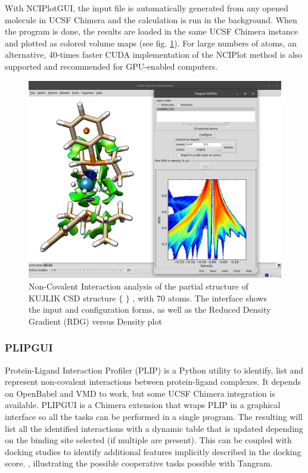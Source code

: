 With NCIPlotGUI, the input file is automatically generated from any opened molecule in UCSF Chimera and the calculation is run in the background. When the program is done, the results are loaded in the same UCSF Chimera instance and plotted as colored volume maps (see fig. \ref{fig:tangram-nciplot}). For large numbers of atoms, an alternative, 40-times faster CUDA implementation of the NCIPlot method\cite{nciplotcuda} is also supported and recommended for GPU-enabled computers.



\begin{figure}
	\begin{Center}
		\includegraphics[width=\textwidth]{./figures/05/tangram_nciplot.png}
		\caption[Tangram NCIPlotGUI]{Non-Covalent Interaction analysis of the partial structure of KUJLIK CSD structure $ \{ $ $ \} $ , with 70 atoms. The interface shows the input and configuration forms, as well as the Reduced Density Gradient (RDG) versus Density plot}
		\label{fig:tangram-nciplot}
	\end{Center}
\end{figure}

\subsubsection{PLIPGUI}
Protein-Ligand Interaction Profiler (PLIP)\cite{salentin2015plip} is a Python utility to identify, list and represent non-covalent interactions between protein-ligand complexes. It depends on OpenBabel and VMD to work, but some UCSF Chimera integration is available. PLIPGUI is a Chimera extension that wraps PLIP in a graphical interface so all the tasks can be performed in a single program. The resulting will list all the identified interactions with a dynamic table that is updated depending on the binding site selected (if multiple are present). This can be coupled with docking studies to identify additional features implicitly described in the docking score. , illustrating the possible cooperative tasks possible with Tangram.


